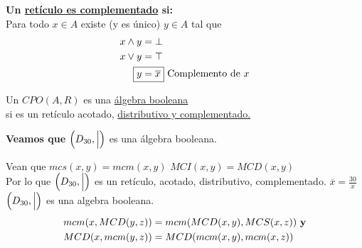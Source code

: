 \documentclass[12pt, twoside]{article}
\begin{document}
\textbf{Un \underline{retículo es complementado} si:}\\
Para todo $x\in A$ existe (y es único) $y\in A$ tal que
\begin{align*}
	x\wedge y &= \bot\\
	x\vee y &= \top\\
	\Aboxed{y &= \overline{x}} \text{ Complemento de $x$}
\end{align*}

Un $CPO(A,R)$ es una \underline{álgebra booleana}\\
si es un retículo acotado, \underline{distributivo y complementado.}

\textbf{Veamos que } $\Big{(}D_{30},\Big{|}\Big{)}$ es una álgebra booleana.
\begin{figure}[H]
	\centering
	
\end{figure}

Vean que $mcs(x,y)=mcm(x,y)$ $MCI(x,y)=MCD(x,y)$\\
Por lo que $\Big{(}D_{30},\Big{|}\Big{)}$
es un retículo, acotado, distributivo, complementado.
$\overline{x} = \frac{30}{x}$ $\Big{(}D_{30},\Big{|}\Big{)}$ es una
algebra booleana.
\begin{align*}
	mcm(x,MCD(y,z)) &= mcm(MCD(x,y),MCS(x,z)) \text{ \textbf{y}}\\
	MCD(x,mcm(y,z)) &= MCD(mcm(x,y),mcm(x,z))
\end{align*}
\end{document}
